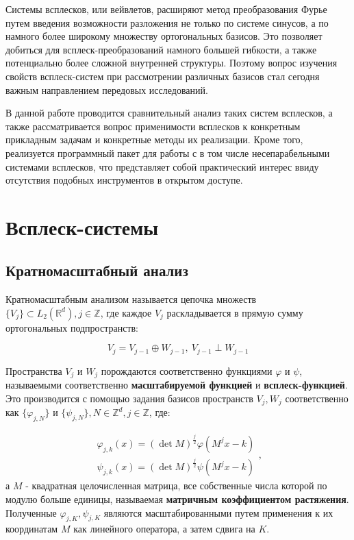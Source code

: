 \documentclass[a4paper,article,14pt]{extarticle}
\begin{document}
Системы всплесков, или вейвлетов, расширяют метод преобразования Фурье путем введения возможности разложения не только по системе синусов, а по намного более широкому множеству ортогональных базисов. Это позволяет добиться для всплеск-преобразований намного большей гибкости, а также потенциально более сложной внутренней структуры. Поэтому вопрос изучения свойств всплеск-систем при рассмотрении различных базисов стал сегодня важным направлением передовых исследований.

В данной работе проводится сравнительный анализ таких систем всплесков, а также рассматривается вопрос применимости всплесков к конкретным прикладным задачам и конкретные методы их реализации. Кроме того, реализуется программный пакет для работы с в том числе несепарабельными системами всплесков, что представляет собой практический интерес ввиду отсутствия подобных инструментов в открытом доступе.

\justifying
\pagebreak
\section{Всплеск-системы}

\subsection{Кратномасштабный анализ}

Кратномасштабным анализом называется цепочка множеств $\{V_j\} \subset L_2(\mathbb{R}^d), j \in \mathbb{Z}$, где каждое $V_j$ раскладывается в прямую сумму ортогональных подпространств:

\[
	V_j = V_{j-1} \oplus W_{j-1}, ~ V_{j-1} \perp W_{j-1}
\]

Пространства $V_j$ и $W_j$ порождаются соответственно функциями $\varphi$ и $\psi$, называемыми соответственно \textbf{масштабируемой функцией} и \textbf{всплеск-функцией}. Это производится с помощью задания базисов пространств $V_j, W_j$ соответственно как $\{\varphi_{j,N}\}$ и $\{\psi_{j,N}\}, N \in \mathbb{Z}^d, j \in \mathbb{Z}$, где:

\[
	\begin{split}
	\varphi_{j,k} (x) = (\det M)^{\frac{j}{2}} \varphi(M^j x - k) \\
	\psi_{j,k} (x) = (\det M)^{\frac{j}{2}} \psi(M^j x - k)
\end{split},
\]
а $M$ - квадратная целочисленная матрица, все собственные числа которой по модулю больше единицы, называемая \textbf{матричным коэффициентом растяжения}. Полученные $\varphi_{j,K}, \psi_{j,K}$ являются масштабированными путем применения к их координатам $M$ как линейного оператора, а затем сдвига на $K$.
\end{document}
